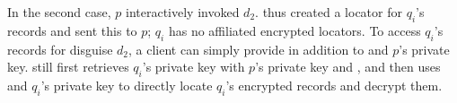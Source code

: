 %
In the second case, $p$ interactively invoked $d_2$. \sys thus created a locator  for
$q_i$'s records and sent this to $p$; $q_i$ has no affiliated encrypted locators. To access $q_i$'s
records for disguise $d_2$, a client can simply provide  in addition to  and
$p$'s private key. \sys still first retrieves $q_i$'s private key with $p$'s private key and
, and then uses  and $q_i$'s private key to directly locate $q_i$'s
encrypted records and decrypt them.
%

